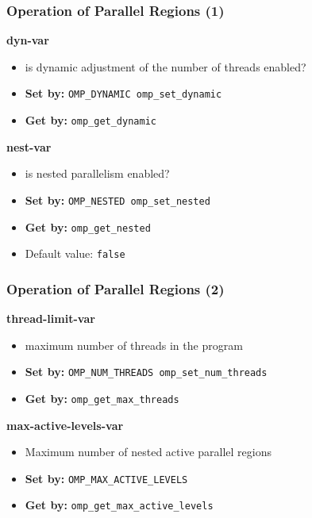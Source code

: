 \documentclass[aspectratio=43]{beamer}
\newenvironment{changemargin}[1]{%
  \begin{list}{}{%
    \setlength{\topsep}{0pt}%
    \setlength{\leftmargin}{#1}%
    \setlength{\rightmargin}{1em}
    \setlength{\listparindent}{\parindent}%
    \setlength{\itemindent}{\parindent}%
    \setlength{\parsep}{\parskip}%
  }%
  \item[]}{\end{list}}
\begin{document}
\begin{frame}
  \frametitle{Operation of Parallel Regions (1)}

  \begin{changemargin}{1.5cm}

  {\bf dyn-var}
  \begin{itemize}
    \item is dynamic adjustment of the number of threads enabled?
    \item {\bf Set by:} {\tt OMP\_DYNAMIC omp\_set\_dynamic}
    \item {\bf Get by:} {\tt omp\_get\_dynamic}
  \end{itemize}
  \vfill
  {\bf nest-var}
  \begin{itemize}
    \item is nested parallelism enabled?
    \item {\bf Set by:} {\tt OMP\_NESTED omp\_set\_nested}
    \item {\bf Get by:} {\tt omp\_get\_nested}
    \item Default value: {\tt false}
  \end{itemize}
  \end{changemargin}

\end{frame}

\begin{frame}
  \frametitle{Operation of Parallel Regions (2)}
  
  \begin{changemargin}{1.5cm}
  {\bf thread-limit-var}
  \begin{itemize}
    \item maximum number of threads in the program
    \item {\bf Set by:} {\tt OMP\_NUM\_THREADS omp\_set\_num\_threads}
    \item {\bf Get by:} {\tt omp\_get\_max\_threads}
  \end{itemize}
  \vfill
  {\bf max-active-levels-var}
  \begin{itemize}
    \item Maximum number of nested active parallel regions
    \item {\bf Set by:} {\tt OMP\_MAX\_ACTIVE\_LEVELS}\\
      \hspace{3.8em}{\tt omp\_set\_max\_active\_levels}
    \item {\bf Get by:} {\tt omp\_get\_max\_active\_levels}
  \end{itemize}
  \end{changemargin}

\end{frame}
\end{document}
